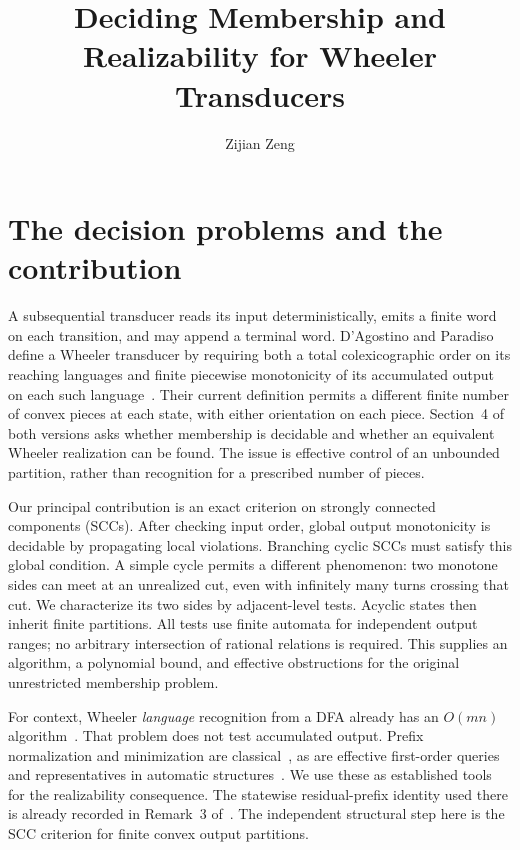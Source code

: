 \documentclass[acmsmall,screen,nonacm,11pt]{acmart}
\title{Deciding Membership and Realizability for Wheeler Transducers}
\author{Zijian Zeng}
\affiliation{\institution{UCSI University}\city{Kuala Lumpur}\country{Malaysia}}
\theoremstyle{definition}
\begin{document}
\maketitle
\pagestyle{plain}
\newpage

\section{The decision problems and the contribution}

A subsequential transducer reads its input deterministically, emits a finite
word on each transition, and may append a terminal word. D'Agostino and
Paradiso define a Wheeler transducer by requiring both a total colexicographic
order on its reaching languages and finite piecewise monotonicity of its
accumulated output on each such language~\cite{DP26,DP26short}.
Their current definition permits a different finite number of convex pieces
at each state, with either orientation on each piece. Section~4 of both
versions asks whether membership is decidable and whether an equivalent
Wheeler realization can be found. The issue is effective control of an
unbounded partition, rather than recognition for a prescribed number of pieces.

Our principal contribution is an exact criterion on strongly connected
components (SCCs). After checking input order, global output monotonicity is
decidable by propagating local violations. Branching cyclic SCCs must satisfy
this global condition. A simple cycle permits a different phenomenon: two
monotone sides can meet at an unrealized cut, even with infinitely many turns
crossing that cut. We characterize its two sides by adjacent-level tests.
Acyclic states then inherit finite partitions. All tests use finite automata
for independent output ranges; no arbitrary intersection of rational
relations is required. This supplies an algorithm, a polynomial bound, and
effective obstructions for the original unrestricted membership problem.

For context, Wheeler \emph{language} recognition from a DFA already has an
$O(mn)$ algorithm~\cite{Becker23}. That problem does not test accumulated
output. Prefix normalization and minimization are classical~\cite{BC00},
as are effective first-order queries and representatives in automatic
structures~\cite{Blum99,BG00}. We use these as established tools for the
realizability consequence. The statewise residual-prefix identity used there
is already recorded in Remark~3 of~\cite{DP26}. The independent structural
step here is the SCC criterion for finite convex output partitions.
\end{document}
